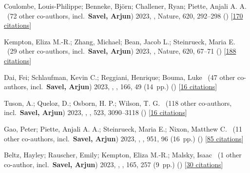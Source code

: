 \item[{\color{numcolor}\scriptsize23}] Coulombe, Louis-Philippe; Benneke, Bj{\"o}rn; Challener, Ryan; Piette, Anjali A. A. \etal{}\ ({72} other co-authors, incl.\ \textbf{Savel, Arjun}) 2023, , Nature, {620}, 292--298 () [\href{https://ui.adsabs.harvard.edu/abs/2023Natur.620..292C}{170 citations}]

\item[{\color{numcolor}\scriptsize22}] Kempton, Eliza M.-R.; Zhang, Michael; Bean, Jacob L.; Steinrueck, Maria E. \etal{}\ ({29} other co-authors, incl.\ \textbf{Savel, Arjun}) 2023, , Nature, {620}, 67--71 () [\href{https://ui.adsabs.harvard.edu/abs/2023Natur.620...67K}{188 citations}]

\item[{\color{numcolor}\scriptsize21}] Dai, Fei; Schlaufman, Kevin C.; Reggiani, Henrique; Bouma, Luke \etal{}\ ({47} other co-authors, incl.\ \textbf{Savel, Arjun}) 2023, , \aj, {166}, 49 (14~pp.) () [\href{https://ui.adsabs.harvard.edu/abs/2023AJ....166...49D}{16 citations}]

\item[{\color{numcolor}\scriptsize20}] Tuson, A.; Queloz, D.; Osborn, H. P.; Wilson, T. G. \etal{}\ ({118} other co-authors, incl.\ \textbf{Savel, Arjun}) 2023, , \mnras, {523}, 3090--3118 () [\href{https://ui.adsabs.harvard.edu/abs/2023MNRAS.523.3090T}{16 citations}]

\item[{\color{numcolor}\scriptsize19}] Gao, Peter; Piette, Anjali A. A.; Steinrueck, Maria E.; Nixon, Matthew C. \etal{}\ ({11} other co-authors, incl.\ \textbf{Savel, Arjun}) 2023, , \apj, {951}, 96 (16~pp.) () [\href{https://ui.adsabs.harvard.edu/abs/2023ApJ...951...96G}{85 citations}]

\item[{\color{numcolor}\scriptsize18}] Beltz, Hayley; Rauscher, Emily; Kempton, Eliza M.-R.; Malsky, Isaac \etal{}\ ({1} other co-author, incl.\ \textbf{Savel, Arjun}) 2023, , \aj, {165}, 257 (9~pp.) () [\href{https://ui.adsabs.harvard.edu/abs/2023AJ....165..257B}{30 citations}]

